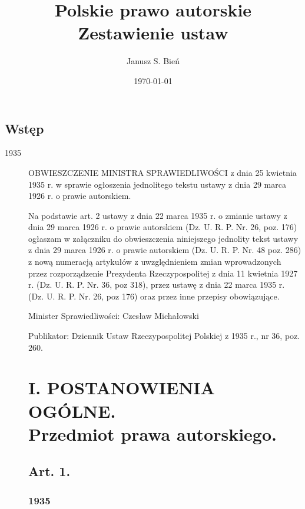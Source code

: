 \documentclass[withmarginpar]{book}
\begin{document}
\title{Polskie prawo autorskie\\Zestawienie ustaw}

\author{Janusz S. Bień}

\date{\today}


\maketitle


\section{Wstęp}
\label{sec:wstęp}

\begin{description}
\item[1935] OBWIESZCZENIE MINISTRA SPRAWIEDLIWOŚCI z dnia 25 kwietnia
  1935 r.  w sprawie ogłoszenia jednolitego tekstu ustawy z dnia 29
  marca 1926 r. o prawie autorskiem.

  Na podstawie art. 2 ustawy z dnia 22 marca 1935 r. o zmianie ustawy
  z dnia 29 marca 1926 r. o prawie autorskiem (Dz. U. R. P. Nr. 26,
  poz. 176) ogłaszam w załączniku do obwieszczenia niniejszego
  jednolity tekst ustawy z dnia 29 marca 1926 r. o prawie autorskiem
  (Dz. U. R. P. Nr. 48 poz. 286) z nową numeracją artykułów z
  uwzględnieniem zmian wprowadzonych przez rozporządzenie Prezydenta
  Rzeczypospolitej z dnia 11 kwietnia 1927 r. (Dz. U. R. P. Nr. 36,
  poz 318), przez ustawę z dnia 22 marca 1935 r. (Dz. U. R. P. Nr. 26,
  poz 176) oraz przez inne przepisy obowiązujące.

Minister Sprawiedliwości: Czesław Michałowski

Publikator: Dziennik Ustaw Rzeczypospolitej Polskiej z 1935 r., nr 36, poz. 260.

\chapter{I. POSTANOWIENIA OGÓLNE.\\ Przedmiot prawa autorskiego.}
\label{cha:i.-post-ogoln}

\section{Art. 1.}
\label{sec:art.-1}

\subsection{1935}


\end{description}
\end{document}
